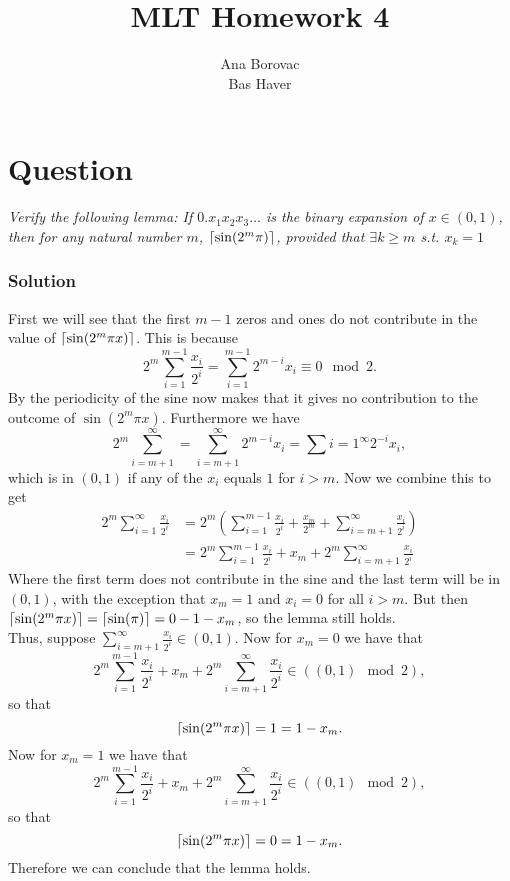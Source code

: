 \documentclass{article}
\title{MLT Homework 4}
\author{Ana Borovac  \\ Bas Haver}
\DeclarePairedDelimiter\ceil{\lceil}{\rceil}
\newcounter{counterquestion}
\newenvironment{question}[1]
{
\stepcounter{counterquestion}
\section*{Question \thecounterquestion}
\emph{#1} 
} 
{
}
\newenvironment{solution}
{
\subsubsection*{Solution}
} 
{
}
\begin{document}
\maketitle

\begin{question}{Verify the following lemma: If $0.x_1x_2x_3\dots $ is the binary expansion of $x\in (0,1)$, then for any natural number $m$, $\ceil{\sin (2^m \pi ) }$, provided that $\exists k \geq m$ s.t. $x_k=1$}
\begin{solution}
First we will see that the first $m-1$ zeros and ones do not contribute in the value of $\ceil{ \sin (2^m \pi x)}$. This is because $$2^m \sum _{i=1} ^{m-1} \frac{x_i}{2^i}=\sum _{i=1} ^{m-1} 2^{m-i} x_i \equiv 0 \mod 2.$$
By the periodicity of the sine now makes that it gives no contribution to the outcome of $\sin (2^m \pi x)$. Furthermore we have $$2^m \sum _{i=m+1} ^{\infty } =\sum _{i=m+1} ^{\infty} 2^{m-i}x_i=\sum {i=1} ^{\infty } 2^{-i} x_i,$$ which is in $(0,1)$ if any of the $x_i$ equals $1$ for $i>m$. Now we combine this to get 
\begin{align*}
2^m \sum _{i=1} ^{\infty} \frac{x_i}{2^i}&=2^m (\sum _{i=1} ^{m-1} \frac{x_i}{2^i}+ \frac{x_m}{2^m} + \sum _{i=m+1} ^{\infty} \frac{x_i}{2^i})\\
&= 2^m \sum _{i=1} ^{m-1} \frac{x_i}{2^i} +x_m + 2^m\sum _{i=m+1} ^{\infty} \frac{x_i}{2^i}
\end{align*}
Where the first term does not contribute in the sine and the last term will be in $(0,1)$, with the exception that $x_m=1$ and $x_i=0$ for all $i>m$. But then $\ceil{ \sin (2^m \pi x) }= \ceil {\sin (\pi ) }=0-1-x_m$, so the lemma still holds.\\
Thus, suppose $\sum _{i=m+1} ^{\infty } \frac{x_i}{2^i}\in (0,1)$. Now for $x_m=0$ we have that $$2^m \sum _{i=1} ^{m-1} \frac{x_i}{2^i} +x_m + 2^m\sum _{i=m+1} ^{\infty} \frac{x_i}{2^i} \in ((0,1) \mod 2),$$
so that $$\ceil{ \sin (2^m \pi x ) } = 1=1-x_m.$$
Now for $x_m=1$ we have that $$2^m \sum _{i=1} ^{m-1} \frac{x_i}{2^i} +x_m + 2^m\sum _{i=m+1} ^{\infty} \frac{x_i}{2^i} \in ((0,1) \mod 2),$$
so that $$\ceil{ \sin (2^m \pi x ) } = 0=1-x_m.$$
Therefore we can conclude that the lemma holds.
\end{solution}
\end{question}
\end{document}
